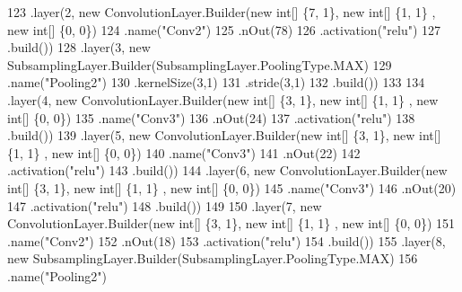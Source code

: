 \begin{DoxyCode}
123 \textcolor{comment}{                .layer(2, new ConvolutionLayer.Builder(new int[] \{7, 1\}, new int[] \{1, 1\} , new int[] \{0,
       0\})}
124 \textcolor{comment}{                        .name("Conv2")}
125 \textcolor{comment}{                        .nOut(78)}
126 \textcolor{comment}{                        .activation("relu")}
127 \textcolor{comment}{                        .build())}
128 \textcolor{comment}{                .layer(3, new SubsamplingLayer.Builder(SubsamplingLayer.PoolingType.MAX)}
129 \textcolor{comment}{                        .name("Pooling2")}
130 \textcolor{comment}{                        .kernelSize(3,1)}
131 \textcolor{comment}{                        .stride(3,1)}
132 \textcolor{comment}{                        .build())}
133 \textcolor{comment}{                }
134 \textcolor{comment}{                .layer(4, new ConvolutionLayer.Builder(new int[] \{3, 1\}, new int[] \{1, 1\} , new int[] \{0,
       0\})}
135 \textcolor{comment}{                        .name("Conv3")}
136 \textcolor{comment}{                        .nOut(24)}
137 \textcolor{comment}{                        .activation("relu")}
138 \textcolor{comment}{                        .build())}
139 \textcolor{comment}{                .layer(5, new ConvolutionLayer.Builder(new int[] \{3, 1\}, new int[] \{1, 1\} , new int[] \{0,
       0\})}
140 \textcolor{comment}{                        .name("Conv3")}
141 \textcolor{comment}{                        .nOut(22)}
142 \textcolor{comment}{                        .activation("relu")}
143 \textcolor{comment}{                        .build())}
144 \textcolor{comment}{                .layer(6, new ConvolutionLayer.Builder(new int[] \{3, 1\}, new int[] \{1, 1\} , new int[] \{0,
       0\})}
145 \textcolor{comment}{                        .name("Conv3")}
146 \textcolor{comment}{                        .nOut(20)}
147 \textcolor{comment}{                        .activation("relu")}
148 \textcolor{comment}{                        .build())}
149 \textcolor{comment}{                }
150 \textcolor{comment}{                .layer(7, new ConvolutionLayer.Builder(new int[] \{3, 1\}, new int[] \{1, 1\} , new int[] \{0,
       0\})}
151 \textcolor{comment}{                        .name("Conv2")}
152 \textcolor{comment}{                        .nOut(18)}
153 \textcolor{comment}{                        .activation("relu")}
154 \textcolor{comment}{                        .build())}
155 \textcolor{comment}{                .layer(8, new SubsamplingLayer.Builder(SubsamplingLayer.PoolingType.MAX)}
156 \textcolor{comment}{                        .name("Pooling2")}

\end{DoxyCode}
